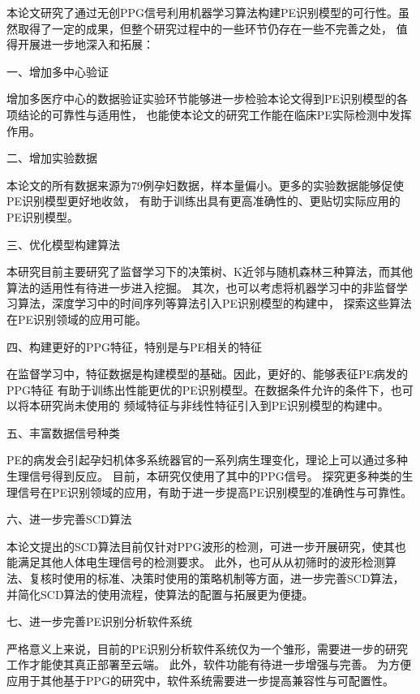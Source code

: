 本论文研究了通过无创PPG信号利用机器学习算法构建PE识别模型的可行性。虽然取得了一定的成果，但整个研究过程中的一些环节仍存在一些不完善之处，
值得开展进一步地深入和拓展：

一、增加多中心验证

增加多医疗中心的数据验证实验环节能够进一步检验本论文得到PE识别模型的各项结论的可靠性与适用性，
也能使本论文的研究工作能在临床PE实际检测中发挥作用。

二、增加实验数据

本论文的所有数据来源为79例孕妇数据，样本量偏小。更多的实验数据能够促使PE识别模型更好地收敛，
有助于训练出具有更高准确性的、更贴切实际应用的PE识别模型。

三、优化模型构建算法

本研究目前主要研究了监督学习下的决策树、K近邻与随机森林三种算法，而其他算法的适用性有待进一步进入挖掘。
其次，也可以考虑将机器学习中的非监督学习算法，深度学习中的时间序列等算法引入PE识别模型的构建中，
探索这些算法在PE识别领域的应用可能。

四、构建更好的PPG特征，特别是与PE相关的特征

在监督学习中，特征数据是构建模型的基础。因此，更好的、能够表征PE病发的PPG特征
有助于训练出性能更优的PE识别模型。在数据条件允许的条件下，也可以将本研究尚未使用的
频域特征与非线性特征引入到PE识别模型的构建中。

五、丰富数据信号种类

PE的病发会引起孕妇机体多系统器官的一系列病生理变化，理论上可以通过多种生理信号得到反应。
目前，本研究仅使用了其中的PPG信号。
探究更多种类的生理信号在PE识别领域的应用，有助于进一步提高PE识别模型的准确性与可靠性。

六、进一步完善SCD算法

本论文提出的SCD算法目前仅针对PPG波形的检测，可进一步开展研究，使其也能满足其他人体电生理信号的检测要求。
此外，也可从从初筛时的波形检测算法、复核时使用的标准、决策时使用的策略机制等方面，进一步完善SCD算法，
并简化SCD算法的使用流程，使算法的配置与拓展更为便捷。

七、进一步完善PE识别分析软件系统

严格意义上来说，目前的PE识别分析软件系统仅为一个雏形，需要进一步的研究工作才能使其真正部署至云端。
此外，软件功能有待进一步增强与完善。
为方便应用于其他基于PPG的研究中，软件系统需要进一步提高兼容性与可配置性。
